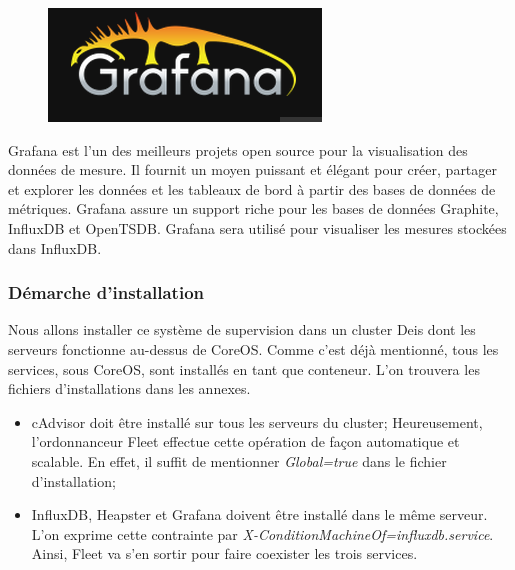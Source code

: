 \begin{onehalfspace}

\begin{figure}
\centering
\includegraphics[scale=0.3]{chapitre4/assets/grafana}
\end{figure}
\noindent Grafana est l'un des meilleurs projets open source pour la visualisation des données de mesure. Il fournit un moyen puissant et élégant pour créer, partager et explorer les données et les tableaux de bord à partir des bases de données de métriques. Grafana assure un support riche pour les bases de données Graphite, InfluxDB et OpenTSDB. Grafana sera utilisé pour visualiser les mesures stockées dans InfluxDB.


\subsubsection{Démarche d'installation}

Nous allons installer ce système de supervision dans un cluster Deis dont les serveurs fonctionne au-dessus de CoreOS. Comme c'est déjà mentionné, tous les services, sous CoreOS, sont installés en tant que conteneur. L'on trouvera les fichiers d'installations dans les annexes.  

\begin{itemize}
	\item cAdvisor doit être installé sur tous les serveurs du cluster; Heureusement, l'ordonnanceur Fleet effectue cette opération de façon automatique et scalable. En effet, il suffit de mentionner \emph{Global=true} dans le fichier d'installation;
	\item InfluxDB, Heapster et Grafana doivent être installé dans le même serveur. L'on exprime cette contrainte par \emph{X-ConditionMachineOf=influxdb.service}. Ainsi, Fleet va s'en sortir pour faire coexister les trois services.
\end{itemize}


\end{onehalfspace}
